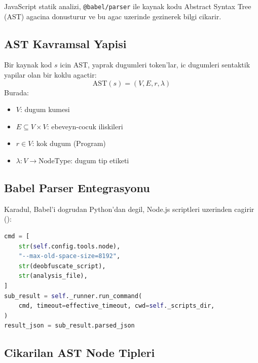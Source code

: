 JavaScript statik analizi, \texttt{@babel/parser} ile kaynak kodu Abstract Syntax Tree (AST) agacina donusturur ve bu agac uzerinde gezinerek bilgi cikarir.

\subsection{AST Kavramsal Yapisi}

\begin{tanim}
Bir kaynak kod $s$ icin AST, yaprak dugumleri token'lar, ic dugumleri sentaktik yapilar olan bir koklu agactir:
\begin{equation}
\label{eq:ast-def}
\text{AST}(s) = (V, E, r, \lambda)
\end{equation}
Burada:
\begin{itemize}
\item $V$: dugum kumesi
\item $E \subseteq V \times V$: ebeveyn-cocuk iliskileri
\item $r \in V$: kok dugum (Program)
\item $\lambda: V \to \text{NodeType}$: dugum tip etiketi
\end{itemize}
\end{tanim}

\subsection{Babel Parser Entegrasyonu}

Karadul, Babel'i dogrudan Python'dan degil, Node.js scriptleri uzerinden cagirir ():

\begin{lstlisting}[language=Python, caption={deobfuscate.mjs cagirma}]
cmd = [
    str(self.config.tools.node),
    "--max-old-space-size=8192",
    str(deobfuscate_script),
    str(analysis_file),
]
sub_result = self._runner.run_command(
    cmd, timeout=effective_timeout, cwd=self._scripts_dir,
)
result_json = sub_result.parsed_json
\end{lstlisting}

\subsection{Cikarilan AST Node Tipleri}

